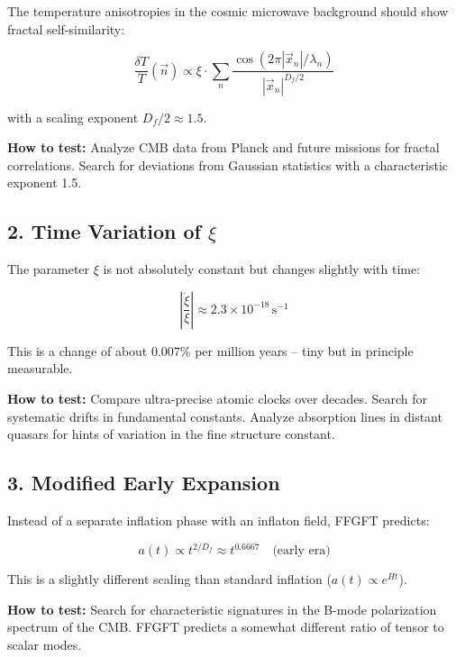 	The temperature anisotropies in the cosmic microwave background should show fractal self-similarity:
	
	\begin{equation}
		\frac{\delta T}{T}(\vec{n}) \propto \xi \cdot \sum_{n} \frac{\cos(2\pi |\vec{x}_n|/\lambda_n)}{|\vec{x}_n|^{D_f/2}}
	\end{equation}
	
	with a scaling exponent $D_f/2 \approx 1.5$.
	
	\textbf{How to test:} Analyze CMB data from Planck and future missions for fractal correlations. Search for deviations from Gaussian statistics with a characteristic exponent 1.5.
	
	\subsection{2. Time Variation of $\xi$}
	
	The parameter $\xi$ is not absolutely constant but changes slightly with time:
	
	\begin{equation}
		\left|\frac{\dot{\xi}}{\xi}\right| \approx 2.3 \times 10^{-18} \, \text{s}^{-1}
	\end{equation}
	
	This is a change of about 0.007\% per million years -- tiny but in principle measurable.
	
	\textbf{How to test:} Compare ultra-precise atomic clocks over decades. Search for systematic drifts in fundamental constants. Analyze absorption lines in distant quasars for hints of variation in the fine structure constant.
	
	\subsection{3. Modified Early Expansion}
	
	Instead of a separate inflation phase with an inflaton field, FFGFT predicts:
	
	\begin{equation}
		a(t) \propto t^{2/D_f} \approx t^{0.6667} \quad \text{(early era)}
	\end{equation}
	
	This is a slightly different scaling than standard inflation ($a(t) \propto e^{Ht}$).
	
	\textbf{How to test:} Search for characteristic signatures in the B-mode polarization spectrum of the CMB. FFGFT predicts a somewhat different ratio of tensor to scalar modes.
	
